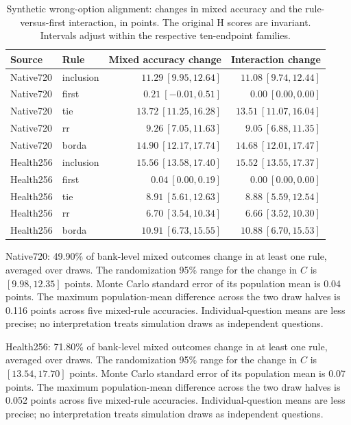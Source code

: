 \begin{table}[ht]
\centering\small
\caption{Synthetic wrong-option alignment: changes in mixed accuracy and the rule-versus-first interaction, in points. The original H scores are invariant. Intervals adjust within the respective ten-endpoint families.}
\begin{tabular}{llrr}
\toprule
Source & Rule & Mixed accuracy change & Interaction change\\
\midrule
Native720 & inclusion & $11.29\ [9.95,12.64]$ & $11.08\ [9.74,12.44]$\\
Native720 & first & $0.21\ [-0.01,0.51]$ & $0.00\ [0.00,0.00]$\\
Native720 & tie & $13.72\ [11.25,16.28]$ & $13.51\ [11.07,16.04]$\\
Native720 & rr & $9.26\ [7.05,11.63]$ & $9.05\ [6.88,11.35]$\\
Native720 & borda & $14.90\ [12.17,17.74]$ & $14.68\ [12.01,17.47]$\\
Health256 & inclusion & $15.56\ [13.58,17.40]$ & $15.52\ [13.55,17.37]$\\
Health256 & first & $0.04\ [0.00,0.19]$ & $0.00\ [0.00,0.00]$\\
Health256 & tie & $8.91\ [5.61,12.63]$ & $8.88\ [5.59,12.54]$\\
Health256 & rr & $6.70\ [3.54,10.34]$ & $6.66\ [3.52,10.30]$\\
Health256 & borda & $10.91\ [6.73,15.55]$ & $10.88\ [6.70,15.53]$\\
\bottomrule
\end{tabular}
\end{table}

Native720: 49.90\% of bank-level mixed outcomes change in at least one rule, averaged over draws. The randomization 95\% range for the change in $C$ is $[9.98,12.35]$ points. Monte Carlo standard error of its population mean is 0.04 points. The maximum population-mean difference across the two draw halves is 0.116 points across five mixed-rule accuracies. Individual-question means are less precise; no interpretation treats simulation draws as independent questions.

Health256: 71.80\% of bank-level mixed outcomes change in at least one rule, averaged over draws. The randomization 95\% range for the change in $C$ is $[13.54,17.70]$ points. Monte Carlo standard error of its population mean is 0.07 points. The maximum population-mean difference across the two draw halves is 0.052 points across five mixed-rule accuracies. Individual-question means are less precise; no interpretation treats simulation draws as independent questions.

